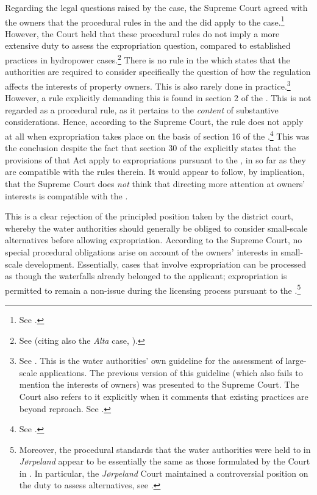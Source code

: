 Regarding the legal questions raised by the case, the Supreme Court agreed with the owners that the procedural rules in the \cite{ea59} and the \cite{paa67} did apply to the case.\footnote{See \cite[32-34]{jorpeland11}.} However, the Court held that these procedural rules do not imply a more extensive duty to assess the expropriation question, compared to established practices in hydropower cases.\footnote{See \cite[51-52]{jorpeland11} (citing also the {\it Alta} case, \cite{alta82}).} There is no rule in the \cite{wra17} which states that the authorities are required to consider specifically the question of how the regulation affects the interests of property owners. This is also rarely done in practice.\footnote{See \cite{stokker10}. This is the water authorities' own guideline for the assessment of large-scale applications. The previous version of this guideline (which also fails to mention the interests of owners) was presented to the Supreme Court. The Court also refers to it explicitly when it comments that existing practices are beyond reproach. See \cite[51]{jorpeland11}.} However, a rule explicitly demanding this is found in section 2 of the \cite{ea59}. This is not regarded as a procedural rule, as it pertains to the {\it content} of substantive considerations. Hence, according to the Supreme Court, the rule does not apply at all when expropriation takes place on the basis of section 16 of the \cite{wra17}.\footnote{See \cite[30]{jorpeland11}.} This was the conclusion despite the fact that section 30 of the \cite{ea59} explicitly states that the provisions of that Act apply to expropriations pursuant to the \cite{wra17}, in so far as they are compatible with the rules therein. It would appear to follow, by implication, that the Supreme Court does {\it not} think that directing more attention at owners' interests is compatible with the \cite{wra17}.

This is a clear rejection of the principled position taken by the district court, whereby the water authorities should generally be obliged to consider small-scale alternatives before allowing expropriation. According to the Supreme Court, no special procedural obligations arise on account of the owners' interests in small-scale development. Essentially, cases that involve expropriation can be processed as though the waterfalls already belonged to the applicant; expropriation is permitted to remain a non-issue during the licensing process pursuant to the \cite{wra17}.\footnote{Moreover, the procedural standards that the water authorities were held to in {\it Jørpeland} appear to be essentially the same as those formulated by the Court in \cite{alta82}. In particular, the {\it Jørpeland} Court maintained a controversial position on the duty to assess alternatives, see \cite[157]{winge13}.}

